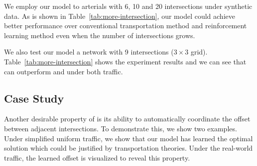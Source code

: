 
We employ our model to arterials with 6, 10 and 20 intersections under synthetic data. As is shown in Table~\ref{tab:more-intersection},  our model could achieve better performance over conventional transportation method \Maxpressure and reinforcement learning method \LIT even when the number of intersections grows. 

We also test our model a network with 9 intersections ($3\times3$ grid). Table~\ref{tab:more-intersection} shows the experiment results and we can see that \PressLight can outperform \Maxpressure and \LIT under both traffic.

\subsection{Case Study}
Another desirable property of \PressLight is its ability to automatically coordinate the offset between adjacent intersections. To demonstrate this, we show two examples. Under simplified uniform traffic, we show that our model has learned the optimal solution which could be justified by transportation theories. Under the real-world traffic, the learned offset is visualized to reveal this property.


